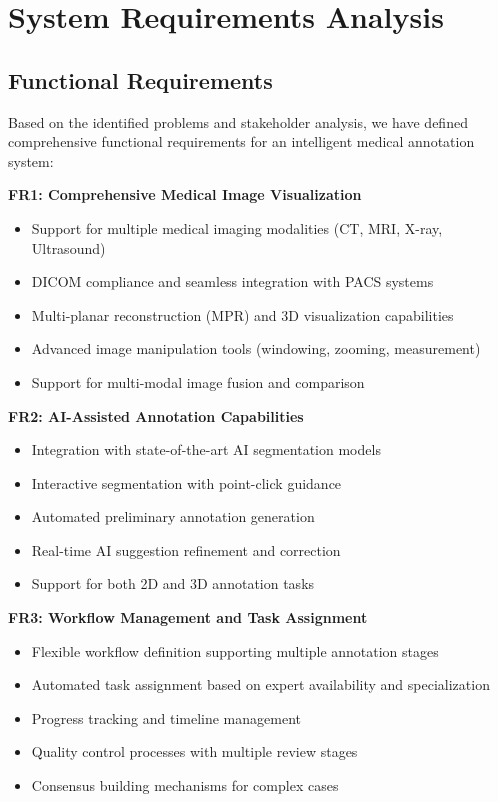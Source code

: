 \section{System Requirements Analysis}

\subsection{Functional Requirements}

Based on the identified problems and stakeholder analysis, we have defined comprehensive functional requirements for an intelligent medical annotation system:

\textbf{FR1: Comprehensive Medical Image Visualization}
\begin{itemize}
    \item Support for multiple medical imaging modalities (CT, MRI, X-ray, Ultrasound)
    \item DICOM compliance and seamless integration with PACS systems
    \item Multi-planar reconstruction (MPR) and 3D visualization capabilities
    \item Advanced image manipulation tools (windowing, zooming, measurement)
    \item Support for multi-modal image fusion and comparison
\end{itemize}

\textbf{FR2: AI-Assisted Annotation Capabilities}
\begin{itemize}
    \item Integration with state-of-the-art AI segmentation models
    \item Interactive segmentation with point-click guidance
    \item Automated preliminary annotation generation
    \item Real-time AI suggestion refinement and correction
    \item Support for both 2D and 3D annotation tasks
\end{itemize}

\textbf{FR3: Workflow Management and Task Assignment}
\begin{itemize}
    \item Flexible workflow definition supporting multiple annotation stages
    \item Automated task assignment based on expert availability and specialization
    \item Progress tracking and timeline management
    \item Quality control processes with multiple review stages
    \item Consensus building mechanisms for complex cases
\end{itemize}

